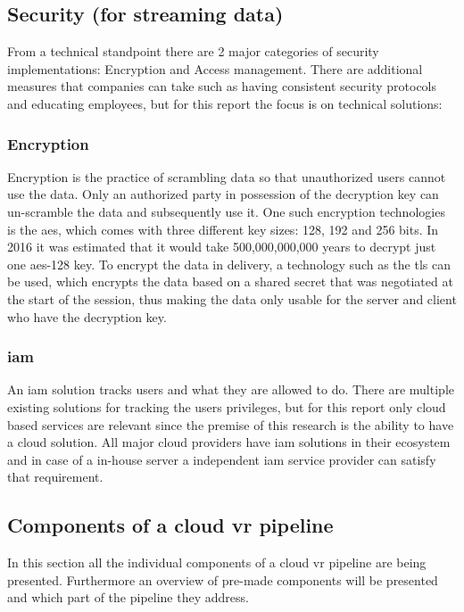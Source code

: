 \subsection{Security (for streaming data)}
From a technical standpoint there are 2 major categories of security implementations: Encryption and Access management. There are additional measures that companies can take such as having consistent security protocols and educating employees, but for this report the focus is on technical solutions:

\subsubsection{Encryption}
Encryption is the practice of scrambling data so that unauthorized users cannot use the data. Only an authorized party in possession of the decryption key can un-scramble the data and subsequently use it. 
One such encryption technologies is the \acrfull{aes}, which comes with three different key sizes: 128, 192 and 256 bits. In 2016 it was estimated that it would take 500,000,000,000 years to decrypt just one \acrshort{aes}-128 key.
To encrypt the data in delivery, a technology such as the \acrfull{tls} can be used, which encrypts the data based on a shared secret that was negotiated at the start of the session, thus making the data only usable for the server and client who have the decryption key.
\subsubsection{\acrfull{iam}}
An \acrshort{iam} solution tracks users and what they are allowed to do. There are multiple existing solutions for tracking the users privileges, but for this report only cloud based services are relevant since the premise of this research is the ability to have a cloud solution. All major cloud providers have \acrshort{iam} solutions in their ecosystem and in case of a in-house server a independent \acrshort{iam} service provider can satisfy that requirement.

\subsection{Components of a cloud \acrshort{vr} pipeline}
In this section all the individual components of a cloud \acrshort{vr} pipeline are being presented. Furthermore an overview of pre-made components will be presented and which part of the pipeline they address.

